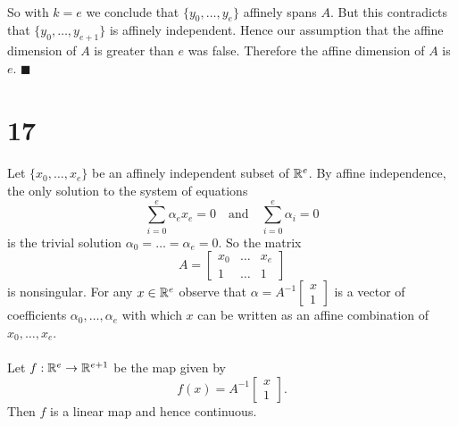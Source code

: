 \documentclass[letterpaper,12pt,oneside,onecolumn]{article}
\begin{document}
\paragraph{}
So with $k=e$ we conclude that $\{y_0, \dots, y_e\}$ affinely spans $A$. But this contradicts that $\{y_0, \dots, y_{e+1}\}$ is affinely independent. Hence our assumption that the affine dimension of $A$ is greater than $e$ was false. Therefore the affine dimension of $A$ is $e$. $\blacksquare$
\section*{17}
\paragraph{}
Let $\{x_0, \dots, x_e\}$ be an affinely independent subset of $\mathbb{R}^e$. By affine independence, the only solution to the system of equations
$$\sum_{i=0}^e \alpha_e x_e =0 \quad \text{and}\quad \sum_{i=0}^e\alpha_i = 0$$
is the trivial solution $\alpha_0 = \dots = \alpha_e = 0$. So the matrix $$A=\begin{bmatrix} x_0 &\dots & x_e\\ 1 & \dots & 1\end{bmatrix}$$
is nonsingular. For any $x \in \mathbb{R}^e$ observe that $\alpha=A^{-1}\begin{bmatrix}x\\1\end{bmatrix}$ is a vector of coefficients $\alpha_0, \dots, \alpha_e$ with which $x$ can be written as an affine combination of $x_0, \dots, x_e$.
\paragraph{}
Let $f : \mathbb{R}^e \rightarrow \mathbb{R}^{e+1}$ be the map given by $$f(x) = A^{-1}\begin{bmatrix}x\\1\end{bmatrix}.$$ Then $f$ is a linear map and hence continuous.
\end{document}
